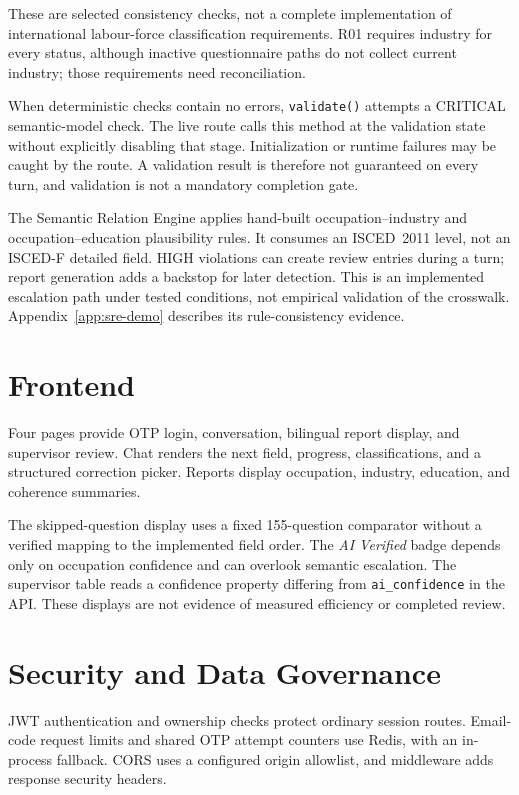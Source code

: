 These are selected consistency checks, not a complete implementation of
international labour-force classification requirements. R01 requires
industry for every status, although inactive questionnaire paths do not
collect current industry; those requirements need reconciliation.

When deterministic checks contain no errors, \texttt{validate()} attempts
a CRITICAL semantic-model check. The live route calls this method at the
validation state without explicitly disabling that stage. Initialization
or runtime failures may be caught by the route. A validation result is
therefore not guaranteed on every turn, and validation is not a mandatory
completion gate.

The Semantic Relation Engine applies hand-built occupation--industry and
occupation--education plausibility rules. It consumes an ISCED~2011 level,
not an ISCED-F detailed field. HIGH violations can create review entries
during a turn; report generation adds a backstop for later detection.
This is an implemented escalation path under tested conditions, not
empirical validation of the crosswalk. Appendix~\ref{app:sre-demo}
describes its rule-consistency evidence.

\section{Frontend}
\label{sec:impl-frontend}

Four pages provide OTP login, conversation, bilingual report display, and
supervisor review. Chat renders the next field, progress, classifications,
and a structured correction picker. Reports display occupation, industry,
education, and coherence summaries.

The skipped-question display uses a fixed 155-question comparator without
a verified mapping to the implemented field order. The \emph{AI Verified}
badge depends only on occupation confidence and can overlook semantic
escalation. The supervisor table reads a confidence property differing
from \texttt{ai\_confidence} in the API. These displays are not evidence of
measured efficiency or completed review.

\section{Security and Data Governance}
\label{sec:impl-governance}

JWT authentication and ownership checks protect ordinary session routes.
Email-code request limits and shared OTP attempt counters use Redis, with
an in-process fallback. CORS uses a configured origin allowlist, and
middleware adds response security headers.

